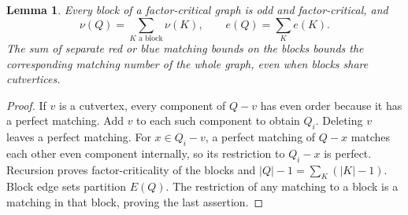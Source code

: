 \documentclass[11pt,a4paper]{article}
\newtheorem{lemma}[theorem]{Lemma}
\theoremstyle{definition}
\begin{document}
\begin{lemma}\label{lem:fc-blocks}
Every block of a factor-critical graph is odd and factor-critical, and
\[
 \nu(Q)=\sum_{K\text{ a block}}\nu(K),\qquad e(Q)=\sum_K e(K).
\]
The sum of separate red or blue matching bounds on the blocks bounds the corresponding matching number of the whole graph, even when blocks share cutvertices.
\end{lemma}
\begin{proof}
If $v$ is a cutvertex, every component of $Q-v$ has even order because it has a perfect matching. Add $v$ to each such component to obtain $Q_i$. Deleting $v$ leaves a perfect matching. For $x\in Q_i-v$, a perfect matching of $Q-x$ matches each other even component internally, so its restriction to $Q_i-x$ is perfect. Recursion proves factor-criticality of the blocks and $|Q|-1=\sum_K(|K|-1)$. Block edge sets partition $E(Q)$. The restriction of any matching to a block is a matching in that block, proving the last assertion.
\end{proof}
\end{document}
